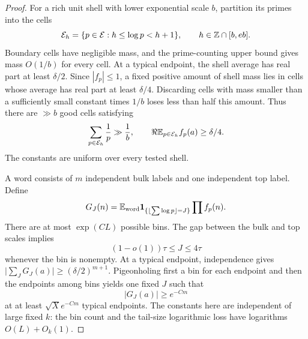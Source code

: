 \begin{proof}
For a rich unit shell with lower exponential scale \(b\), partition
its primes into the cells
\[
 \mathcal E_h=\{p\in\mathcal E:h\le\log p<h+1\},
 \qquad h\in\mathbb Z\cap[b,eb].
\]
Boundary cells have negligible mass, and the prime-counting upper
bound gives mass \(O(1/b)\) for every cell. At a typical endpoint,
the shell average has real part at least \(\delta/2\). Since
\(|f_p|\le1\), a fixed positive amount of shell mass lies in cells
whose average has real part at least \(\delta/4\). Discarding cells
with mass smaller than a sufficiently small constant times \(1/b\)
loses less than half this amount. Thus there are \(\gg b\) good
cells satisfying
\[
 \sum_{p\in\mathcal E_h}\frac1p\gg\frac1b,
 \qquad
 \Re\mathbb E_{p\in\mathcal E_h}f_p(a)\ge\delta/4.
\]
The constants are uniform over every tested shell.

A word consists of \(m\) independent bulk labels and one independent
top label. Define
\[
 G_J(n)=\mathbb E_{\rm word}
  \mathbf 1_{\{\lfloor\sum\log p\rfloor=J\}}\prod f_p(n).
\]
There are at most \(\exp(CL)\) possible bins. The gap between the
bulk and top scales implies
\[
 (1-o(1))\tau\le J\le4\tau
\]
whenever the bin is nonempty. At a typical endpoint,
independence gives
\(\big|\sum_JG_J(a)\big|\ge(\delta/2)^{m+1}\).
Pigeonholing first a bin for each endpoint and then the endpoints
among bins yields one fixed \(J\) such that
\[
 |G_J(a)|\ge e^{-Cm}
\]
at at least \(\sqrt X e^{-Cm}\) typical endpoints. The constants
here are independent of large fixed \(k\): the bin count and the
tail-size logarithmic loss have logarithms \(O(L)+O_k(1)\).


\end{proof}
